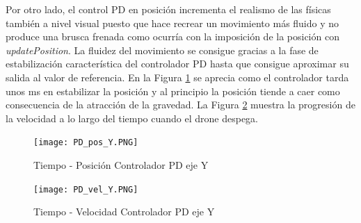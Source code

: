Por otro lado, el control PD en posición incrementa el realismo de las físicas también a nivel visual puesto que hace recrear un movimiento más fluido y no produce una brusca frenada como ocurría con la imposición de la posición con \textit{updatePosition}. La fluidez del movimiento se consigue gracias a la fase de estabilización característica del controlador PD hasta que consigue aproximar su salida al valor de referencia. En la Figura \ref{fig:pos-ejeY} se aprecia como el controlador tarda unos ms en estabilizar la posición y al principio la posición tiende a caer como consecuencia de la atracción de la gravedad. La Figura \ref{fig:vel-ejeY} muestra la progresión de la velocidad a lo largo del tiempo cuando el drone despega.

\begin{figure}[h!]
    \centering
    \texttt{[image: PD\_pos\_Y.PNG]}
    \caption{Tiempo - Posición Controlador PD eje Y}
    \label{fig:pos-ejeY}
\end{figure}

\begin{figure}[h!]
    \centering
    \texttt{[image: PD\_vel\_Y.PNG]}
    \caption{Tiempo - Velocidad Controlador PD eje Y}
    \label{fig:vel-ejeY}
\end{figure}

